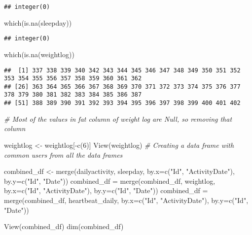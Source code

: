 \documentclass[
]{article}
\newenvironment{Shaded}{\begin{snugshade}}{\end{snugshade}}
\newcommand{\AttributeTok}[1]{\textcolor[rgb]{0.77,0.63,0.00}{#1}}
\newcommand{\CommentTok}[1]{\textcolor[rgb]{0.56,0.35,0.01}{\textit{#1}}}
\newcommand{\DecValTok}[1]{\textcolor[rgb]{0.00,0.00,0.81}{#1}}
\newcommand{\FunctionTok}[1]{\textcolor[rgb]{0.00,0.00,0.00}{#1}}
\newcommand{\NormalTok}[1]{#1}
\newcommand{\OtherTok}[1]{\textcolor[rgb]{0.56,0.35,0.01}{#1}}
\newcommand{\SpecialCharTok}[1]{\textcolor[rgb]{0.00,0.00,0.00}{#1}}
\newcommand{\StringTok}[1]{\textcolor[rgb]{0.31,0.60,0.02}{#1}}
\begin{document}
\begin{verbatim}
## integer(0)
\end{verbatim}

\begin{Shaded}
\begin{Highlighting}[]
\FunctionTok{which}\NormalTok{(}\FunctionTok{is.na}\NormalTok{(sleepday))}
\end{Highlighting}
\end{Shaded}

\begin{verbatim}
## integer(0)
\end{verbatim}

\begin{Shaded}
\begin{Highlighting}[]
\FunctionTok{which}\NormalTok{(}\FunctionTok{is.na}\NormalTok{(weightlog))}
\end{Highlighting}
\end{Shaded}

\begin{verbatim}
##  [1] 337 338 339 340 342 343 344 345 346 347 348 349 350 351 352 353 354 355 356 357 358 359 360 361 362
## [26] 363 364 365 366 367 368 369 370 371 372 373 374 375 376 377 378 379 380 381 382 383 384 385 386 387
## [51] 388 389 390 391 392 393 394 395 396 397 398 399 400 401 402
\end{verbatim}

\begin{Shaded}
\begin{Highlighting}[]
\CommentTok{\# Most of the values in fat column of weight log are Null, so removing that column }

\NormalTok{weightlog }\OtherTok{\textless{}{-}}\NormalTok{ weightlog[}\SpecialCharTok{{-}}\FunctionTok{c}\NormalTok{(}\DecValTok{6}\NormalTok{)]}
\FunctionTok{View}\NormalTok{(weightlog)}
\CommentTok{\# Creating a data frame with common users from all the data frames}

\NormalTok{combined\_df }\OtherTok{\textless{}{-}} \FunctionTok{merge}\NormalTok{(dailyactivity, sleepday, }\AttributeTok{by.x=}\FunctionTok{c}\NormalTok{(}\StringTok{"Id"}\NormalTok{, }\StringTok{"ActivityDate"}\NormalTok{), }\AttributeTok{by.y=}\FunctionTok{c}\NormalTok{(}\StringTok{"Id"}\NormalTok{, }\StringTok{"Date"}\NormalTok{))}
\NormalTok{combined\_df }\OtherTok{=} \FunctionTok{merge}\NormalTok{(combined\_df, weightlog, }\AttributeTok{by.x=}\FunctionTok{c}\NormalTok{(}\StringTok{"Id"}\NormalTok{, }\StringTok{"ActivityDate"}\NormalTok{), }\AttributeTok{by.y=}\FunctionTok{c}\NormalTok{(}\StringTok{"Id"}\NormalTok{, }\StringTok{"Date"}\NormalTok{))}
\NormalTok{combined\_df }\OtherTok{=} \FunctionTok{merge}\NormalTok{(combined\_df, heartbeat\_daily, }\AttributeTok{by.x=}\FunctionTok{c}\NormalTok{(}\StringTok{"Id"}\NormalTok{, }\StringTok{"ActivityDate"}\NormalTok{), }\AttributeTok{by.y=}\FunctionTok{c}\NormalTok{(}\StringTok{"Id"}\NormalTok{, }\StringTok{"Date"}\NormalTok{))}

\FunctionTok{View}\NormalTok{(combined\_df)}
\FunctionTok{dim}\NormalTok{(combined\_df)}
\end{Highlighting}
\end{Shaded}
\end{document}

